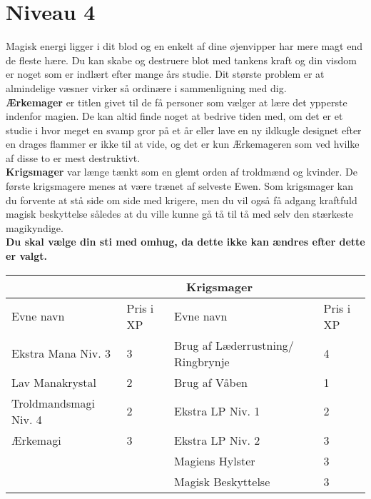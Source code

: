 \chapter*{Niveau 4}
Magisk energi ligger i dit blod og en enkelt af dine øjenvipper har mere magt end de fleste hære. Du kan skabe og destruere blot med tankens kraft og din visdom er noget som er indlært efter mange års studie. Dit største problem er at almindelige væsner virker så ordinære i sammenligning med dig.\\

\textbf{Ærkemager} er titlen givet til de få personer som vælger at lære det ypperste indenfor magien. De kan altid finde noget at bedrive tiden med, om det er et studie i hvor meget en svamp gror på et år eller lave en ny ildkugle designet efter en drages flammer er ikke til at vide, og det er kun Ærkemageren som ved hvilke af disse to er mest destruktivt.\\
\textbf{Krigsmager} var længe tænkt som en glemt orden af troldmænd og kvinder. De første krigsmagere menes at være trænet af selveste Ewen. Som krigsmager kan du forvente at stå side om side med krigere, men du vil også få adgang kraftfuld magisk beskyttelse således at du ville kunne gå tå til tå med selv den stærkeste magikyndige.\\

\textbf{Du skal vælge din sti med omhug, da dette ikke kan ændres efter dette er valgt.}\\


\begin{tabular}{|p{}|p{}|p{}|p{}|}
\hline
\rowcolor{cerulean!80}
 \multicolumn{2}{|c|}{ Ærkemager } & \multicolumn{2}{|c|}{ Krigsmager }\\
\hline
\rowcolor{cerulean!40}
    Evne navn & Pris i XP & Evne navn & Pris i XP\\ \hline
    Ekstra Mana Niv. 3 & 3& Brug af Læderrustning/ Ringbrynje & 4\\\hline
    Lav Manakrystal & 2& Brug af Våben & 1 \\\hline
    Troldmandsmagi Niv. 4 & 2 & Ekstra LP Niv. 1 & 2\\\hline
    Ærkemagi & 3& Ekstra LP Niv. 2 & 3\\\hline
    && Magiens Hylster& 3\\\hline
    && Magisk Beskyttelse & 3\\\hline
\end{tabular}

